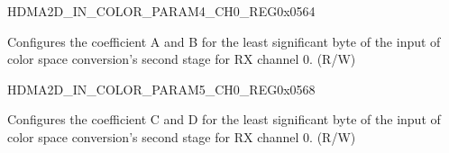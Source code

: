 \begin{register}{H}{DMA2D\_IN\_COLOR\_PARAM4\_CH0\_REG}{0x0564}\label{regdesc:DMA2DINCOLORPARAM4CH0REG}
%
%
\regnewline%
\begin{regdesc}\begin{reglist}
\label{fielddesc:DMA2DINCOLORPARAML0CH0}\item [DMA2D\_IN\_COLOR\_PARAM\_L0\_CH0] Configures the coefficient A and B for the least significant byte of the input of color space conversion's second stage for RX channel 0. (R/W)
\end{reglist}\end{regdesc}
\end{register}


\begin{register}{H}{DMA2D\_IN\_COLOR\_PARAM5\_CH0\_REG}{0x0568}\label{regdesc:DMA2DINCOLORPARAM5CH0REG}
%
%
\regnewline%
\begin{regdesc}\begin{reglist}
\label{fielddesc:DMA2DINCOLORPARAML1CH0}\item [DMA2D\_IN\_COLOR\_PARAM\_L1\_CH0] Configures the coefficient C and D for the least significant byte of the input of color space conversion's second stage for RX channel 0. (R/W)
\end{reglist}\end{regdesc}
\end{register}


